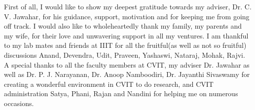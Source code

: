 First of all, I would like to show my deepest gratitude towards my adviser, Dr. C. V. Jawahar, for his guidance, support, motivation and for keeping me from
going off track.
I would also like to wholeheartedly thank my family, my parents and my wife, for their love and unwavering support in all my ventures. 
I am thankful to my lab mates and friends at IIIT for all the fruitful(as well as not so fruitful) discussions Anand, Devendra, Udit, Praveen, Yashaswi, Nataraj, Mohak, Rajvi. 
A special thanks to all the faculty members at CVIT, my adviser Dr. Jawahar as well as Dr. P. J. Narayanan, Dr. Anoop Namboodiri, Dr. Jayanthi Sivaswamy for creating a wonderful environment in CVIT to do research, and CVIT administration Satya, Phani, Rajan and Nandini for helping me on numerous occasions. 